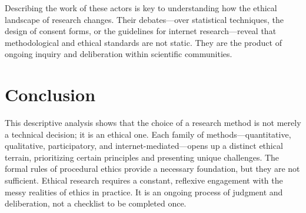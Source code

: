 \documentclass[11pt, letterpaper]{article}
\begin{document}
Describing the work of these actors is key to understanding how the ethical landscape of research changes. Their debates---over statistical techniques, the design of consent forms, or the guidelines for internet research---reveal that methodological and ethical standards are not static. They are the product of ongoing inquiry and deliberation within scientific communities.

\section{Conclusion}

This descriptive analysis shows that the choice of a research method is not merely a technical decision; it is an ethical one. Each family of methods---quantitative, qualitative, participatory, and internet-mediated---opens up a distinct ethical terrain, prioritizing certain principles and presenting unique challenges. The formal rules of procedural ethics provide a necessary foundation, but they are not sufficient. Ethical research requires a constant, reflexive engagement with the messy realities of ethics in practice. It is an ongoing process of judgment and deliberation, not a checklist to be completed once.



\end{document}
